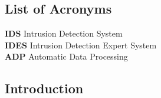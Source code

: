 \documentclass[12pt]{article}
\begin{document}
       
   
    \begin{center}
    \huge{\section*{List of Acronyms}\label{sec:intro}}
    \end{center}
    \textbf{IDS}\hspace{1cm} \tabto{35mm} Intrusion Detection System
    \\
    \textbf{IDES}\hspace{1cm} \tabto{35mm} Intrusion Detection Expert System 
    \\
    \textbf{ADP}\hspace{1cm} \tabto{35mm} Automatic Data Processing
    \\
    
   
    \clearpage
    
    
    \begin{center}
        \huge{\section{Introduction}\label{sec:intro}}
    \end{center}
    
\end{document}
